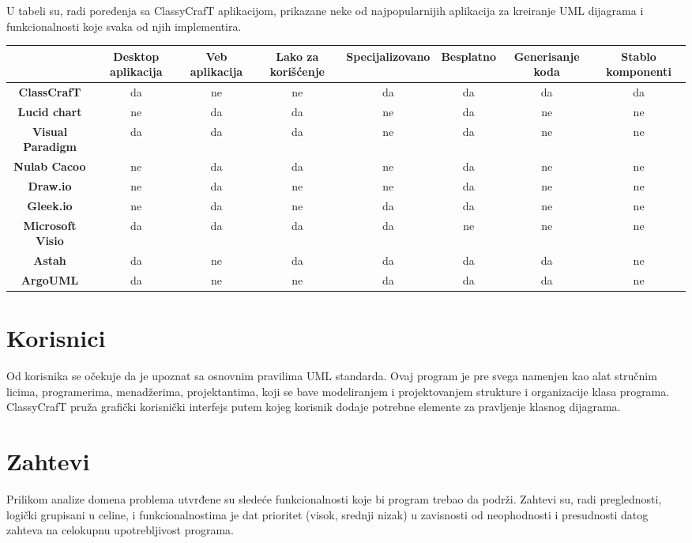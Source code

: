 \documentclass[a4paper]{article}
\begin{document}
U tabeli su, radi poređenja sa ClassyCrafT aplikacijom, prikazane neke od najpopularnijih aplikacija za kreiranje UML dijagrama i funkcionalnosti koje svaka od njih implementira.

\begin{table}
\Huge
\centering
\begin{adjustbox}{width=\textwidth}
\def\arraystretch{1.8}
\begin{tabular}{ |c|c|c|c|c|c|c|c| } \hline
    & \bf{Desktop aplikacija} & \bf{Veb aplikacija}  & \bf{Lako za korišćenje} & \bf{Specijalizovano} & \bf{Besplatno} & \bf{Generisanje koda} & \bf{Stablo komponenti}  \\ \hline
 \bf{ClassCrafT} &da &ne  &ne  &da  &da &da &da  \\ \hline
 \bf{Lucid chart} &ne  &da  &da  &ne &da &ne &ne   \\ \hline
 \bf{Visual Paradigm} &da  &da  &da  &ne  &da &ne &ne   \\ \hline
 \bf{Nulab Cacoo} &ne  &da  &da  &ne  &da &ne &ne   \\ \hline
 \bf{Draw.io} &ne  &da  &ne  &ne  &da &ne &ne \\ \hline
 \bf{Gleek.io} &ne  &da  &ne  &da  &da &ne &ne  \\ \hline
 \bf{Microsoft Visio} &da  &da  &da  &da  &ne &ne &ne \\ \hline
 \bf{Astah} &da  &ne  &da  &da  &da &da &ne  \\ \hline
 \bf{ArgoUML} &da  &ne  &ne  &da  &da &da &ne  \\ \hline

\end{tabular}
\end{adjustbox}
\end{table}


\section{Korisnici}
Od korisnika se očekuje da je upoznat sa osnovnim pravilima UML standarda. Ovaj program je pre svega namenjen kao alat stručnim licima, programerima, menadžerima, projektantima, koji se bave modeliranjem i projektovanjem strukture i organizacije klasa programa. ClassyCrafT pruža grafički korisnički interfejs putem kojeg korisnik dodaje potrebne elemente za pravljenje klasnog dijagrama. 
\section{Zahtevi}
Prilikom analize domena problema utvrđene su sledeće funkcionalnosti koje bi program trebao da podrži. Zahtevi su, radi preglednosti, logički grupisani u celine, i funkcionalnostima je dat prioritet (visok, srednji nizak) u zavisnosti od neophodnosti i presudnosti datog zahteva na celokupnu upotrebljivost programa.
\end{document}
